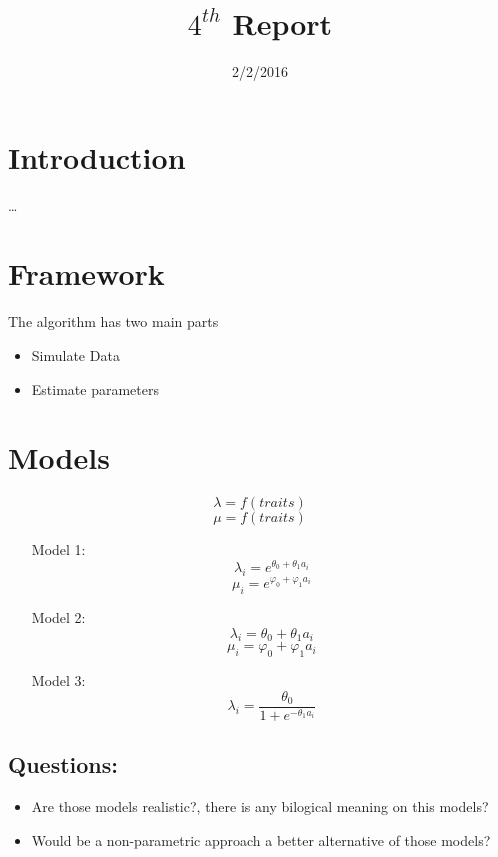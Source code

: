 \documentclass[]{article}
\title{\(4^{th}\) Report}
\author{}
\date{2/2/2016}
\begin{document}
\maketitle


\section{Introduction}

\ldots{}

\section{Framework}

The algorithm has two main parts

\begin{itemize}
    \item Simulate Data
    \item Estimate parameters
\end{itemize}

\section{Models}

\[ \lambda = f(traits) \] \[ \mu = f(traits) \]

\begin{itemize}

    \item[Model 1:]
        $$\lambda_i = e^{\theta_0 + \theta_1 a_i} $$
        $$ \mu_i = e^{\varphi_0 + \varphi_1 a_i} $$
    \item[Model 2:] 
        $$\lambda_i = \theta_0 + \theta_1 a_i $$
        $$ \mu_i = \varphi_0 + \varphi_1 a_i $$
    \item[Model 3:]
        $$\lambda_i = \frac{\theta_0}{1+e^{-\theta_1 a_i}}$$
\end{itemize}

\subsection{Questions:}

\begin{itemize}
        \item Are those models realistic?, there is any bilogical meaning on this models? 
        \item Would be a non-parametric approach a better alternative of those models?

    \end{itemize}
\end{document}
